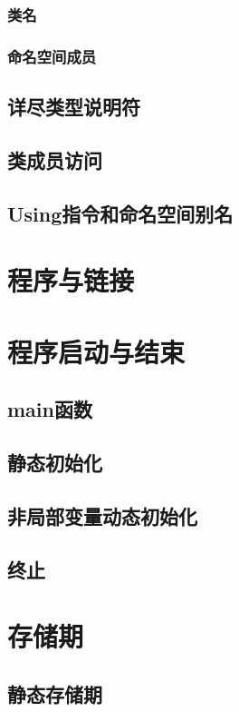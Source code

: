 \subsubsection{类名}
\subsubsection{命名空间成员}

\subsection{详尽类型说明符}

\subsection{类成员访问}

\subsection{Using指令和命名空间别名}

\section{程序与链接}

\section{程序启动与结束}
\subsection{main函数}
\subsection{静态初始化}
\subsection{非局部变量动态初始化}
\subsection{终止}

\section{存储期}
\subsection{静态存储期}
